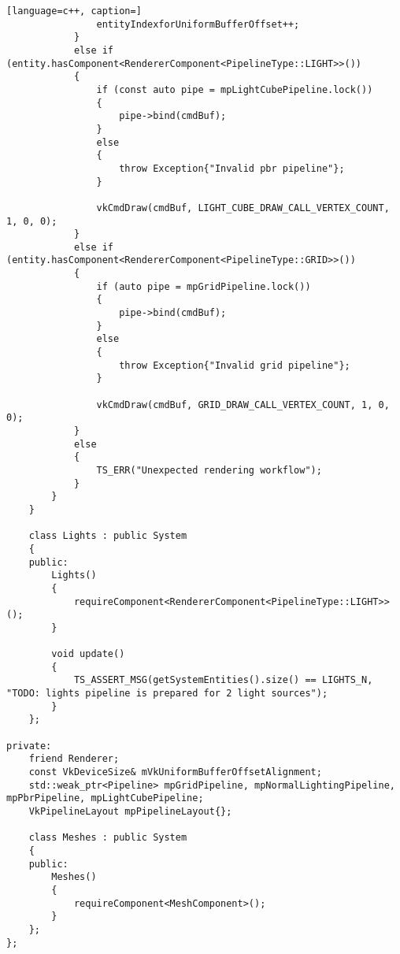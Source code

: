 \begin{itemize}
\begin{lstlisting}[language=c++, caption=]
                entityIndexforUniformBufferOffset++;
            }
            else if (entity.hasComponent<RendererComponent<PipelineType::LIGHT>>())
            {
                if (const auto pipe = mpLightCubePipeline.lock())
                {
                    pipe->bind(cmdBuf);
                }
                else
                {
                    throw Exception{"Invalid pbr pipeline"};
                }

                vkCmdDraw(cmdBuf, LIGHT_CUBE_DRAW_CALL_VERTEX_COUNT, 1, 0, 0);
            }
            else if (entity.hasComponent<RendererComponent<PipelineType::GRID>>())
            {
                if (auto pipe = mpGridPipeline.lock())
                {
                    pipe->bind(cmdBuf);
                }
                else
                {
                    throw Exception{"Invalid grid pipeline"};
                }

                vkCmdDraw(cmdBuf, GRID_DRAW_CALL_VERTEX_COUNT, 1, 0, 0);
            }
            else
            {
                TS_ERR("Unexpected rendering workflow");
            }
        }
    }

    class Lights : public System
    {
    public:
        Lights()
        {
            requireComponent<RendererComponent<PipelineType::LIGHT>>();
        }

        void update()
        {
            TS_ASSERT_MSG(getSystemEntities().size() == LIGHTS_N, "TODO: lights pipeline is prepared for 2 light sources");
        }
    };

private:
    friend Renderer;
    const VkDeviceSize& mVkUniformBufferOffsetAlignment;
    std::weak_ptr<Pipeline> mpGridPipeline, mpNormalLightingPipeline, mpPbrPipeline, mpLightCubePipeline;
    VkPipelineLayout mpPipelineLayout{};

    class Meshes : public System
    {
    public:
        Meshes()
        {
            requireComponent<MeshComponent>();
        }
    };
};
\end{lstlisting}
\end{itemize}


